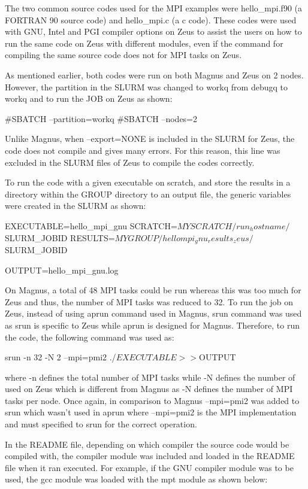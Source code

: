 \begin{Document}
The two common source codes used for the MPI examples were hello_mpi.f90 (a FORTRAN 90 source code) and hello_mpi.c (a c code). These codes were used 
with GNU, Intel and PGI compiler options on Zeus to assist the users on how to run the same code on Zeus with different modules, even if the command 
for compiling the same source code does not for MPI tasks on Zeus.

As mentioned earlier, both codes were run on both Magnus and Zeus on 2 nodes. However, the partition in the SLURM was changed to workq from debugq to 
workq and to run the JOB on Zeus as shown:

#SBATCH --partition=workq
#SBATCH --nodes=2

Unlike Magnus, when --export=NONE is included in the SLURM for Zeus, the code does not compile and gives many errors. For this reason, this line was
excluded in the SLURM files of Zeus to compile the codes correctly.

To run the code with a given executable on scratch, and store the results in a directory within the GROUP directory to an output file, the generic 
variables were created in the SLURM as shown:

EXECUTABLE=hello_mpi_gnu
SCRATCH=$MYSCRATCH/run_hostname/$SLURM_JOBID
RESULTS=$MYGROUP/hellompi_gnu_results_zeus/$SLURM_JOBID

OUTPUT=hello_mpi_gnu.log

On Magnus, a total of 48 MPI tasks could be run whereas this was too much for Zeus and thus, the number of MPI tasks was reduced to 32. To run the job
on Zeus, instead of using aprun command used in Magnus, srun command was used as srun is specific to Zeus while aprun is designed for Magnus. Therefore,
to run the code, the following command was used as:

srun -n 32 -N 2 --mpi=pmi2 ./$EXECUTABLE >> ${OUTPUT}

where -n defines the total number of MPI tasks while -N defines the number of used on Zeus which is different from Magnus as -N defines the number of
MPI tasks per node. Once again, in comparison to Magnus --mpi=pmi2 was added to srun which wasn't used in aprun where --mpi=pmi2 is the MPI
implementation and must specified to srun for the correct operation.

In the README file, depending on which compiler the source code would be compiled with, the compiler module was included and loaded in the README file 
when it ran executed. For example, if the GNU compiler module was to be used, the gcc module was loaded with the mpt module as shown below:


\end{Document}

